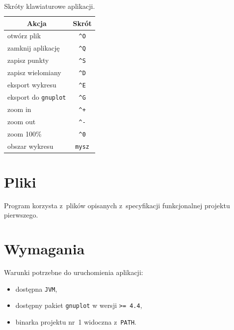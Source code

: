 \documentclass[10pt,a4paper]{article}
\newcommand{\prog}[1]{\texttt{#1}}
\begin{document}
\begin{table}[h]
  \centering
  \begin{tabular}{l c}
    \toprule
    \multicolumn{1}{c}{\bf Akcja} & {\bf Skrót} \\
    \midrule
    otwórz plik              &  \verb|^O|  \\
    zamknij aplikację        &  \verb|^Q|  \\
    zapisz punkty            &  \verb|^S|  \\
    zapisz wielomiany        &  \verb|^D|  \\
    eksport wykresu          &  \verb|^E|  \\
    eksport do {\tt gnuplot} &  \verb|^G|  \\
    \midrule
    zoom in                  &  \verb|^+|  \\
    zoom out                 &  \verb|^-|  \\
    zoom 100\%               &  \verb|^0|  \\
    obszar wykresu           &  \verb|mysz|  \\
    \bottomrule
  \end{tabular}
  \caption{Skróty klawiaturowe aplikacji.}
  \label{tab:skroty}
\end{table}

\section{Pliki}
\label{sec:pliki}

Program korzysta z~plików opisanych z~specyfikacji funkcjonalnej projektu
pierwszego.

\section{Wymagania}
\label{sec:wymagania}

Warunki potrzebne do uruchomienia aplikacji:
\begin{itemize}
  \item dostępna \prog{JVM},
  \item dostępny pakiet \prog{gnuplot} w wersji \prog{>= 4.4},
  \item binarka projektu nr~1 widoczna z~\prog{PATH}.
\end{itemize}
\end{document}
